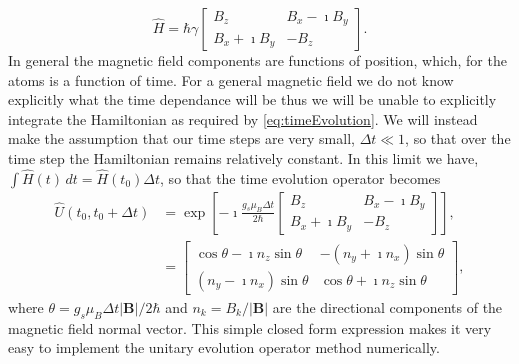 \begin{equation*}
    \widehat{H} = \hbar\gamma \begin{bmatrix} B_z & B_x - \imath B_y \\
                                                      B_x + \imath B_y & -B_z \end{bmatrix}.                                         
\end{equation*}
In general the magnetic field components are functions of position, which, for the atoms is a function of time.
For a general magnetic field we do not know explicitly what the time dependance will be thus we will be unable to explicitly integrate the Hamiltonian as required by \autoref{eq:timeEvolution}.
We will instead make the assumption that our time steps are very small, $\Delta t \ll 1$, so that over the time step the Hamiltonian remains relatively constant.
In this limit we have, $\int\widehat{H}(t)\,dt = \widehat{H}(t_0)\Delta t$, so that the time evolution operator becomes
\begin{align}
    \widehat{U}(t_0,t_0+\Delta t) &= \exp\left[  -\imath\frac{g_s\mu_B\Delta t}{2 \hbar} \begin{bmatrix} B_z & B_x - \imath B_y \\
                                                      B_x + \imath B_y & -B_z \end{bmatrix} \right],\\
                &= \begin{bmatrix} \cos\theta - \imath n_z \sin\theta & -\left(n_y+\imath n_x\right)\sin\theta \\
                                   \left(n_y-\imath n_x\right)\sin\theta & \cos\theta + \imath n_z \sin\theta\end{bmatrix}, 
\end{align}
where $\theta = g_s \mu_B \Delta t \vert \mathbf{B} \vert / 2\hbar$ and $n_k = B_k / \vert \mathbf{B} \vert$ are the directional components of the magnetic field normal vector.
This simple closed form expression makes it very easy to implement the unitary evolution operator method numerically.


